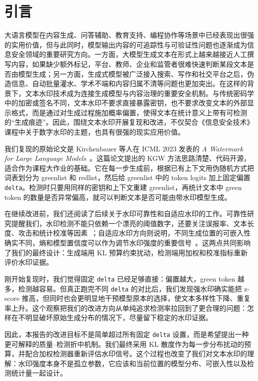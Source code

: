 \documentclass[12pt,a4paper,UTF8]{ctexart}
\begin{document}
\clearpage
{}
\tableofcontents
\clearpage
{}

\section{引言}

大语言模型在内容生成、问答辅助、教育支持、编程协作等场景中已经表现出很强的实用价值，但与此同时，模型输出内容的可追踪性与可验证性问题也逐渐成为信息安全领域的重要研究方向。一方面，大模型生成文本在形式上越来越接近人工撰写内容，如果缺少额外标记，平台、教师、企业和监管者很难快速判断某段文本是否由模型生成；另一方面，生成式模型被广泛接入搜索、写作和社交平台之后，伪造信息、自动批量灌水、学术不端和内容归属不清等问题也更加突出。在这样的背景下，文本水印技术成为连接生成模型与内容治理的重要安全机制。与传统密码学中的加密或签名不同，文本水印不要求直接暴露密钥，也不要求改变文本的外部显示格式，而是通过对生成过程施加概率偏置，使得文本在统计意义上带有可检测的“生成痕迹”。因此，围绕文本水印开展复现和改进，不仅契合《信息安全技术》课程中关于数字水印的主题，也具有很强的现实应用价值。

我们复现的原始论文是 Kirchenbauer 等人在 ICML 2023 发表的 \textit{A Watermark for Large Language Models}~\cite{kirchenbauer2023watermark}。这篇论文提出的 KGW 方法思路清楚、代码开源，适合作为课程大作业的基础。它在每一步生成前，根据已有上下文用伪随机方式把词表划分为 greenlist 和 redlist，然后给 greenlist 中的 token logits 加上固定偏置 \texttt{delta}。检测时只要用同样的密钥和上下文重建 greenlist，再统计文本中 green token 的数量是否异常偏高，就可以判断文本是否可能由带水印模型生成。

在继续改进前，我们还阅读了后续关于水印可靠性和自适应水印的工作。可靠性研究提醒我们，水印检测不能只依赖一个漂亮的阈值数字，还要关注误报率、文本长度、攻击和统计校准等因素~\cite{kirchenbauer2024reliability}；自适应水印方向则说明，不同生成位置的可嵌入性确实不同，熵和模型置信度可以作为调节水印强度的重要信号~\cite{liu2024adaptive}。这两点共同影响了我们的最终设计：生成端用 KL 预算约束扰动，检测端用加权和校准指标重新评价水印证据。

刚开始复现时，我们觉得固定 \texttt{delta} 已经足够直接：偏置越大，green token 越多，检测越容易。但真正跑完不同 \texttt{delta} 的对比后，我们发现强水印确实能把 z-score 推高，但同时也会更明显地干预模型原本的选择，使文本多样性下降、重复率上升。这个观察把我们的改进方向从单纯追求检测率拉回到了更合理的问题：怎样在不明显破坏原始生成分布的情况下，尽量留下稳定的水印证据。

因此，本报告的改进目标不是简单超过所有固定 \texttt{delta} 设置，而是希望提出一种更可解释的质量--检测折中机制。我们最终采用 KL 散度作为每一步分布扰动的预算，并配合加权检测器重新评估水印信号。这个过程也改变了我们对文本水印的理解：水印强度本身不是孤立参数，它应该和当前位置的模型分布、可嵌入性以及检测统计量一起设计。
\end{document}
